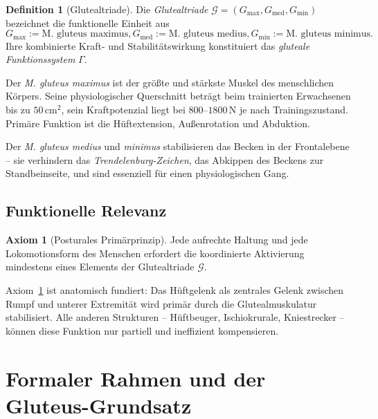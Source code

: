 ﻿\documentclass[12pt,a4paper]{report}
\theoremstyle{plain}
\theoremstyle{definition}
\newtheorem{definition}[theorem]{Definition}
\newtheorem{axiom}[theorem]{Axiom}
\theoremstyle{remark}
\newcommand{\med}{\mathrm{med}}  %
\begin{document}
	\begin{definition}[Glutealtriade]
		Die \emph{Glutealtriade} $\mathcal{G} = (G_{\max}, G_{\med}, G_{\min})$
		bezeichnet die funktionelle Einheit aus
		\[
		G_{\max} := \text{M. gluteus maximus},
		G_{\med} := \text{M. gluteus medius},
		G_{\min} := \text{M. gluteus minimus.}
		\]
		Ihre kombinierte Kraft- und Stabilitätswirkung konstituiert das
		\emph{gluteale Funktionssystem} $\Gamma$.
	\end{definition}
	
	Der \emph{M. gluteus maximus} ist der größte und stärkste Muskel des
	menschlichen Körpers. Seine physiologischer Querschnitt beträgt beim
	trainierten Erwachsenen bis zu $50\,\mathrm{cm}^2$,
	sein Kraftpotenzial liegt bei $800$--$1800\,\mathrm{N}$
	je nach Trainingszustand. Primäre Funktion ist die Hüftextension,
	Außenrotation und Abduktion.
	
	Der \emph{M. gluteus medius} und \emph{minimus} stabilisieren das Becken
	in der Frontalebene -- sie verhindern das \emph{Trendelenburg-Zeichen},
	das Abkippen des Beckens zur Standbeinseite, und sind essenziell
	für einen physiologischen Gang.
	
	\section{Funktionelle Relevanz}
	
	\begin{axiom}[Posturales Primärprinzip]
		\label{ax:postural}
		Jede aufrechte Haltung und jede Lokomotionsform des Menschen erfordert
		die koordinierte Aktivierung mindestens eines Elements der Glutealtriade $\mathcal{G}$.
	\end{axiom}
	
	Axiom~\ref{ax:postural} ist anatomisch fundiert: Das Hüftgelenk als zentrales
	Gelenk zwischen Rumpf und unterer Extremität wird primär durch die
	Glutealmuskulatur stabilisiert. Alle anderen Strukturen -- Hüftbeuger,
	Ischiokrurale, Kniestrecker -- können diese Funktion nur partiell und
	ineffizient kompensieren.
	
	\chapter{Formaler Rahmen und der Gluteus-Grundsatz}
	\label{chap:formalisierung}
	
\end{document}
